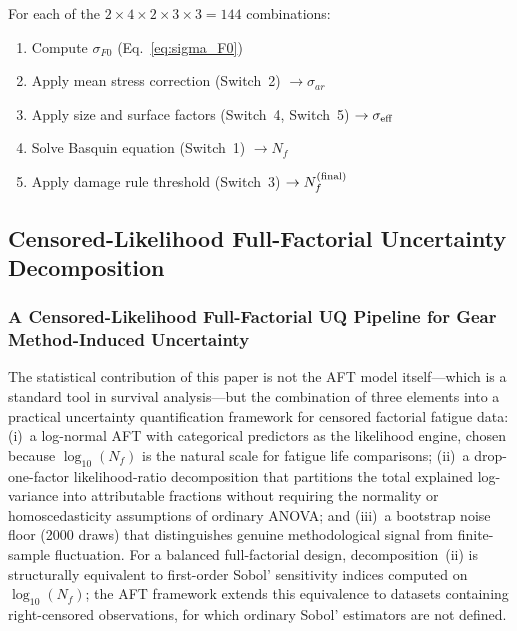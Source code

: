 \documentclass[twocolumn,12pt,a4paper]{article}
\begin{document}
For each of the $2\times4\times2\times3\times3 = 144$ combinations:
\begin{enumerate}
  \item Compute $\sigma_{F0}$ (Eq.~\ref{eq:sigma_F0})
  \item Apply mean stress correction (Switch~2) $\rightarrow \sigma_{ar}$
  \item Apply size and surface factors (Switch~4, Switch~5)
        $\rightarrow \sigma_{\rm eff}$
  \item Solve Basquin equation (Switch~1) $\rightarrow N_f$
  \item Apply damage rule threshold (Switch~3)
        $\rightarrow N_f^{\rm (final)}$
\end{enumerate}

\subsection{Censored-Likelihood Full-Factorial Uncertainty Decomposition}

\subsubsection{A Censored-Likelihood Full-Factorial UQ Pipeline for Gear Method-Induced Uncertainty}

The statistical contribution of this paper is not the AFT model
itself---which is a standard tool in survival analysis---but the
combination of three elements into a practical uncertainty
quantification framework for censored factorial fatigue data:
(i)~a log-normal AFT with categorical predictors as the likelihood
engine, chosen because $\log_{10}(N_f)$ is the natural scale for
fatigue life comparisons; (ii)~a drop-one-factor likelihood-ratio
decomposition that partitions the total explained log-variance into
attributable fractions without requiring the normality or
homoscedasticity assumptions of ordinary ANOVA; and (iii)~a bootstrap
noise floor (2000 draws) that distinguishes genuine methodological
signal from finite-sample fluctuation. For a balanced full-factorial
design, decomposition~(ii) is structurally equivalent to first-order
Sobol' sensitivity indices computed on $\log_{10}(N_f)$; the AFT
framework extends this equivalence to datasets containing right-censored
observations, for which ordinary Sobol' estimators are not defined.
\end{document}
